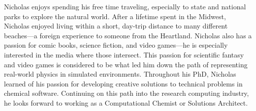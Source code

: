 Nicholas enjoys spending his free time traveling, especially to state and national parks to explore the natural world.
After a lifetime spent in the Midwest, Nicholas enjoyed living within a short, day-trip distance to many different beaches---a foreign experience to someone from the Heartland.
Nicholas also has a passion for comic books, science fiction, and video games---he is especially interested in the media where those intersect.
This passion for scientific fantasy and video games is considered to be what led him down the path of representing real-world physics in simulated environments.
Throughout his PhD, Nicholas learned of his passion for developing creative solutions to technical problems in chemical software. 
Continuing on this path into the research computing industry, he looks forward to working as a Computational Chemist or Solutions Architect.
